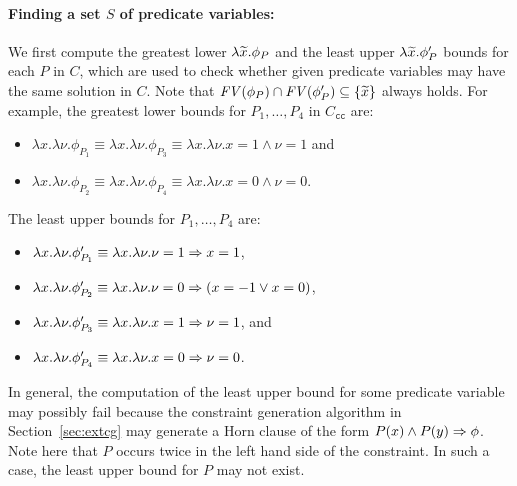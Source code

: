 \paragraph{Finding a set \(S\) of predicate variables:}
We first compute the greatest lower \(\lambda \widetilde{x}.\phi_P\) and the 
least upper \(\lambda \widetilde{x}.\phi_P'\) bounds for each \(P\) in \(C\), 
which are used to check whether given predicate variables may have the 
same solution in \(C\).  Note that \(\mathit{FV}({\phi_P}) \cap \mathit{FV}({\phi_P'}) 
\subseteq \{{\widetilde{x}}\}\) always holds.
%
For example, the greatest lower bounds for \(P_1,\dots,P_4\) in 
\(C_{\texttt{cc}}\) are:
\begin{itemize}
\item \(\lambda x.\lambda \nu.\phi_{P_1} \equiv \lambda x.\lambda \nu.\phi_{P_3} \equiv \lambda x.\lambda \nu.x=1 \land \nu=1\) and
\item \(\lambda x.\lambda \nu.\phi_{P_2} \equiv \lambda x.\lambda \nu.\phi_{P_4} \equiv \lambda x.\lambda \nu.x=0 \land \nu=0\).
\end{itemize}
The least upper bounds for \(P_1,\dots,P_4\) are:
\begin{itemize}
\item \(\lambda x.\lambda \nu.\phi_{P_1}'\equiv \lambda x.\lambda \nu.\nu=1 \Rightarrow x=1\),
\item \(\lambda x.\lambda \nu.\phi_{P_2}'\equiv \lambda x.\lambda \nu.\nu=0 \Rightarrow (x=-1 \lor x=0)\),
\item \(\lambda x.\lambda \nu.\phi_{P_3}'\equiv \lambda x.\lambda \nu.x=1 \Rightarrow \nu=1\), and
\item \(\lambda x.\lambda \nu.\phi_{P_4}'\equiv \lambda x.\lambda \nu.x=0 \Rightarrow \nu=0\).
\end{itemize}

In general, the computation of the least upper bound for some predicate 
variable may possibly fail because the constraint generation algorithm 
in Section~\ref{sec:extcg} may generate a Horn clause of the form 
\(P(x)\land P(y) \Rightarrow \phi\).  Note here that \(P\) occurs twice in 
the left hand side of the constraint.  In such a case, the least upper 
bound for \(P\) may not exist.

